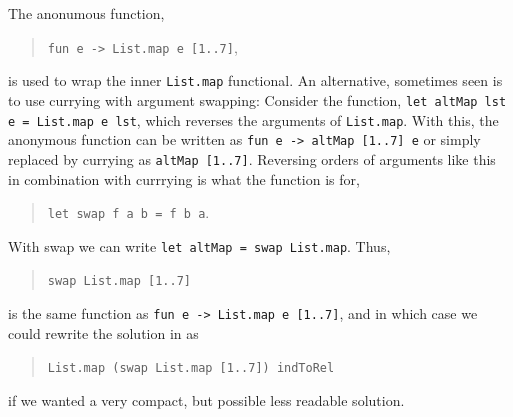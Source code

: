 \documentclass[fsharpNotes.tex]{subfiles}
\begin{document}

%
%
The anonumous function,
\begin{quote}
\lstinline{fun e -> List.map e [1..7]},
\end{quote}
is used to wrap the inner \lstinline{List.map} functional. An alternative, sometimes seen is to use currying with argument swapping: Consider the function, \lstinline{let altMap lst e = List.map e lst}, which reverses the arguments of \lstinline{List.map}. With this, the anonymous function can be written as \lstinline{fun e -> altMap [1..7] e} or simply replaced by currying as \lstinline{altMap [1..7]}. Reversing orders of arguments like this in combination with currrying is what the  function is for,
\begin{quote}
\lstinline{let swap f a b = f b a}.
\end{quote}
With swap we can write \lstinline{let altMap = swap List.map}. Thus,
\begin{quote}
\lstinline{swap List.map [1..7]}
\end{quote}
is the same function as \lstinline{fun e -> List.map e [1..7]}, and in which case we could rewrite the solution in  as
\begin{quote}
\lstinline{List.map (swap List.map [1..7]) indToRel}
\end{quote}
if we wanted a very compact, but possible less readable solution.
\end{document}
